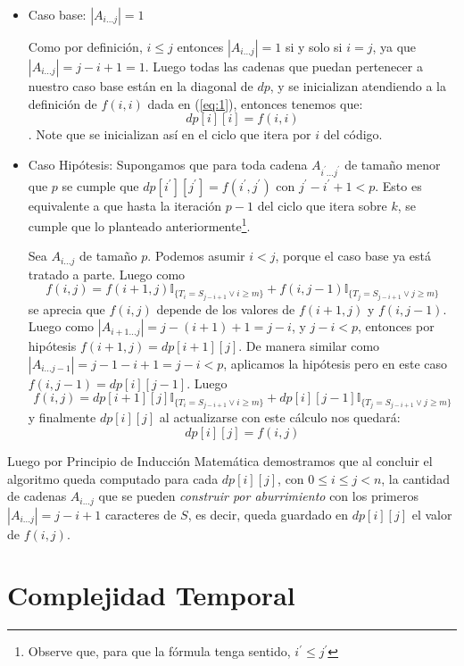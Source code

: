 \documentclass[a4paper]{article}
\begin{document}
	\begin{itemize}
		\item Caso base: $|A_{i...j}| = 1$
		
		Como por definición, $i \leq j$ entonces $|A_{i...j}| = 1$ si y solo si $i = j$, ya que $|A_{i...j}| = j-i + 1 = 1$.
		Luego todas las cadenas que puedan pertenecer a nuestro caso base están en la diagonal de $dp$, y se inicializan atendiendo a la definición de $f(i, i)$ dada en (\ref{eq:1}), entonces tenemos que:
		$$dp[i][i] = f(i, i)$$.
		Note que se inicializan así en el ciclo que itera por $i$ del código.
		
		\item Caso Hipótesis: Supongamos que para toda cadena $A_{i^\prime...j^\prime}$ de tamaño menor que $p$ se cumple que $dp[i^\prime][j^\prime] = f(i^\prime, j^\prime)$ con $j^\prime - i^\prime + 1 < p$. Esto es equivalente a que hasta la iteración $p-1$ del ciclo que itera sobre $k$, se cumple que lo planteado anteriormente\footnote{Observe que, para que la fórmula tenga sentido, $i^\prime \leq j^\prime$}.
		
		Sea $A_{i...j}$ de tamaño $p$. Podemos asumir $i<j$, porque el caso base ya está tratado a parte. Luego como
		$$f(i,j) = f(i+1,j)\mathbb{I}_{ \{T_i = S_{j-i+1} \vee i \geq m \}}  +  f(i,j-1)\mathbb{I}_{ \{T_j = S_{j-i+1} \vee j \geq m \} } $$
		se aprecia que $f(i,j)$ depende de los valores de $f(i+1,j)$ y $f(i,j-1)$. Luego como $|A_{i+1...j}| = j-(i+1) + 1 = j-i$, y $j-i < p$, entonces por hipótesis $f(i+1,j) = dp[i+1][j]$. De manera similar como $|A_{i...j-1}| = j-1 - i + 1 = j-i < p$, aplicamos la hipótesis pero en este caso $f(i,j-1) = dp[i][j-1]$.
		Luego
		$$f(i,j) = dp[i+1][j]\mathbb{I}_{ \{T_i = S_{j-i+1} \vee i \geq m \}}  +  dp[i][j-1]\mathbb{I}_{ \{T_j = S_{j-i+1} \vee j \geq m \} } $$
		y finalmente $dp[i][j]$ al actualizarse con este cálculo nos quedará:
		$$dp[i][j] = f(i,j)$$				
	\end{itemize}

	Luego por Principio de Inducción Matemática demostramos que al concluir el algoritmo queda computado para cada $dp[i][j]$, con $0 \leq i\leq j < n$, la cantidad de cadenas $A_{i...j}$ que se pueden \textit{construir por aburrimiento} con los primeros $|A_{i...j}| = j-i+1$ caracteres de $S$, es decir, queda guardado en $dp[i][j]$ el valor de $f(i,j)$.	
	



	\section*{Complejidad Temporal}
	
\end{document}
